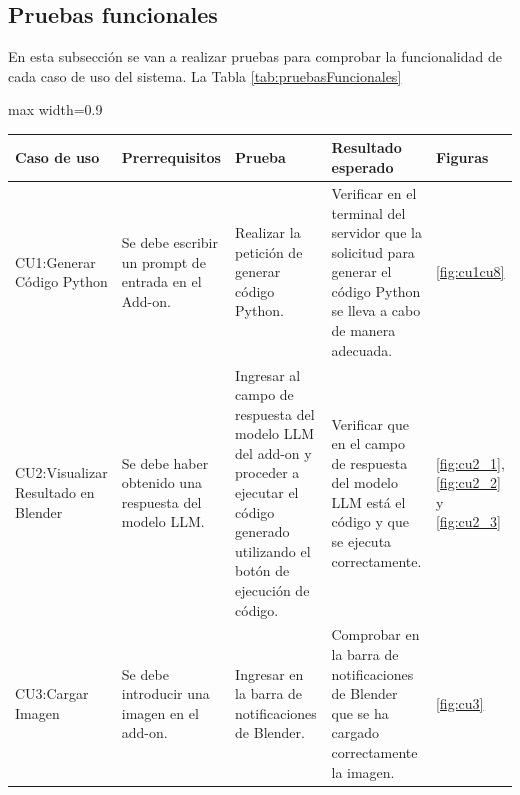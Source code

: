 \subsection{Pruebas funcionales}
En esta subsección se van a realizar pruebas para comprobar la funcionalidad de cada caso de uso del sistema. La Tabla \ref{tab:pruebasFuncionales}
\begin{table}[h!tb]%
  \centering
  \begin{adjustbox}{max width=0.9\textwidth}
    \begin{tabular}{|p{4cm}|p{4cm}|p{4cm}|p{4cm}|p{2cm}|}
      \hline
      \textbf{Caso de uso}                & \textbf{Prerrequisitos}                                                     & \textbf{Prueba}                                                                                                                                             & \textbf{Resultado esperado}                                                                                                             & \textbf{Figuras}                                   \\ \hline

      CU1:Generar Código Python           & Se debe escribir un prompt de entrada en el Add-on.                         & Realizar la petición de generar código Python.                                                                                                              & Verificar en el terminal del servidor que la solicitud para generar el código Python se lleva a cabo de manera adecuada.                & \ref{fig:cu1cu8}                                   \\ \hline

      CU2:Visualizar Resultado en Blender & Se debe haber obtenido una respuesta del modelo LLM.                        & Ingresar al campo de respuesta del modelo LLM del add-on y proceder a ejecutar el código generado utilizando el botón de ejecución de código.               & Verificar que en el campo de respuesta del modelo LLM está el código y que se ejecuta correctamente.                                    & \ref{fig:cu2_1}, \ref{fig:cu2_2} y \ref{fig:cu2_3} \\ \hline

      CU3:Cargar Imagen                   & Se debe introducir una imagen en el add-on.                                 & Ingresar en la barra de notificaciones de Blender.                                                                                                          & Comprobar en la barra de notificaciones de Blender que se ha cargado correctamente la imagen.                                           & \ref{fig:cu3}                                      \\ \hline


\end{tabular}
\end{adjustbox}
\end{table}
